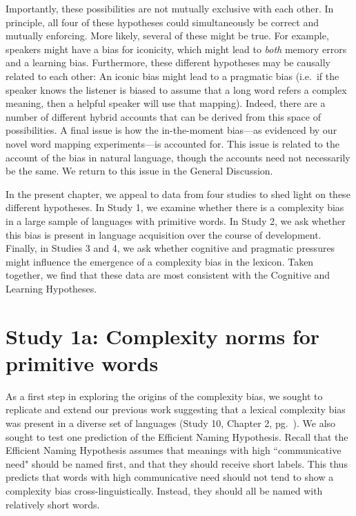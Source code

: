 Importantly, these possibilities are not mutually exclusive with each other. In principle, all four of these hypotheses could simultaneously be correct and mutually enforcing. More likely, several of these might be true. For example, speakers might have a bias for iconicity, which might lead to {\it both} memory errors and a learning bias. Furthermore, these different hypotheses may be causally related to each other: An iconic bias might lead to a pragmatic bias (i.e.\ if the speaker knows the listener is biased to assume that a long word refers a complex meaning, then a helpful speaker will use that mapping). Indeed, there are a number of different hybrid accounts that can be derived from this space of possibilities. A final issue is how the in-the-moment bias---as evidenced by our novel word mapping experiments---is accounted for. This issue is related to the account of the bias in natural language, though the accounts need not necessarily be the same. We return to this issue in the General Discussion.

In the present chapter, we appeal to data from four studies to shed light on these different hypotheses. In Study 1, we examine whether there is a complexity bias in a large sample of languages with primitive words. In Study 2, we ask whether this bias is present in language acquisition over the course of development. Finally, in Studies 3 and 4, we ask whether cognitive and pragmatic pressures might influence the emergence of a complexity bias in the lexicon. Taken together, we find that these data are most consistent with the Cognitive and Learning Hypotheses. 


\section{Study 1a: Complexity norms for primitive words}
As a first step in exploring the origins of the complexity bias, we sought to replicate and extend our previous work suggesting that a lexical complexity bias was present in a diverse set of languages (Study 10, Chapter 2, pg.\ \pageref{ch2-10}). We also sought to test one prediction of the Efficient Naming Hypothesis. Recall that the Efficient Naming Hypothesis assumes that  meanings with high ``communicative need" should be named first, and that they should receive short labels. This thus predicts that words with high communicative need should not tend  to show a complexity bias cross-linguistically. Instead, they should all be named with relatively short words.

